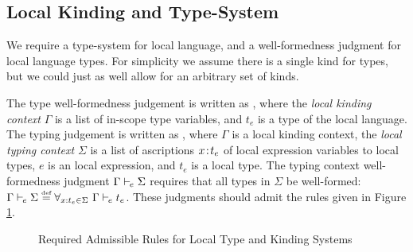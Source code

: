 \subsection{Local Kinding and Type-System}
\label{sec:local-types}
We require a type-system for local language, and a well-formedness judgment for local language types.
For simplicity we assume there is a single kind for types, but we could just as well allow for an arbitrary set of kinds.

The type well-formedness judgement is written as , where the \emph{local kinding context} $\Gamma$ is a list of in-scope type variables, and $t_e$ is a type of the local language.
The typing judgement is written as , where $\Gamma$ is a local kinding context, the \emph{local typing context} $\Sigma$ is a list of ascriptions $x \mkern2mu{:}\mkern2mu t_e$ of local expression variables to local types, $e$ is an local expression, and $t_e$ is a local type.
The typing context well-formedness judgment $\Gamma \vdash_{\mkern-2mu e} \Sigma$ requires that all types in $\Sigma$ be well-formed: $\Gamma \vdash_{\mkern-2mu e} \Sigma \stackrel{\text{\normalfont\tiny def}}{=} \forall_{x : t_e \in \Sigma}~\Gamma \vdash_{\mkern-2mu e} t_e$.
These judgments should admit the rules given in Figure \ref{fig:local-type-rules}.

\begin{figure}
  \caption[Required Admissible Rules]{Required Admissible Rules for Local Type and Kinding Systems}
  \label{fig:local-type-rules}
\end{figure}

